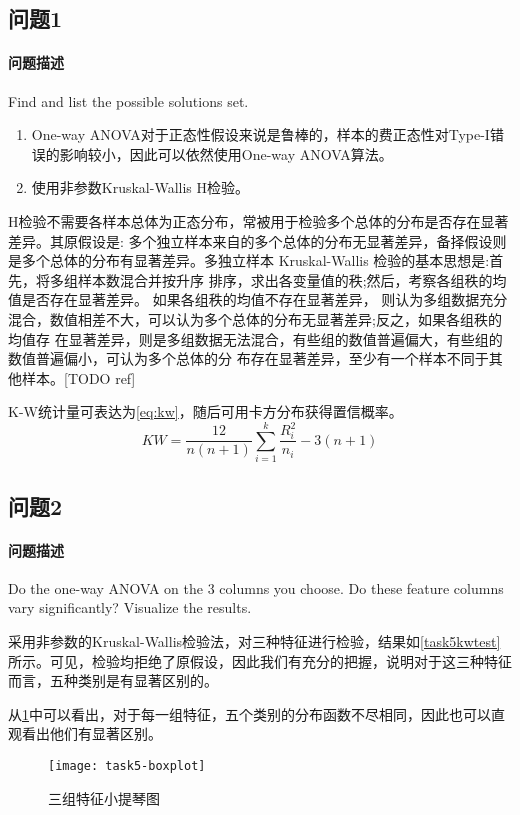 \documentclass[a4paper,12pt]{article}
\begin{document}
    \subsection{问题1} %
    \paragraph{问题描述} Find and list the possible solutions set.
    \begin{enumerate}
      \item One-way ANOVA对于正态性假设来说是鲁棒的，样本的费正态性对Type-I错误的影响较小，因此可以依然使用One-way ANOVA算法。
      \item 使用非参数Kruskal-Wallis H检验。
    \end{enumerate}

    H检验不需要各样本总体为正态分布，常被用于检验多个总体的分布是否存在显著差异。其原假设是: 多个独立样本来自的多个总体的分布无显著差异，备择假设则是多个总体的分布有显著差异。多独立样本 Kruskal-Wallis 检验的基本思想是:首先，将多组样本数混合并按升序 排序，求出各变量值的秩;然后，考察各组秩的均值是否存在显著差异。 如果各组秩的均值不存在显著差异， 则认为多组数据充分混合，数值相差不大，可以认为多个总体的分布无显著差异;反之，如果各组秩的均值存 在显著差异，则是多组数据无法混合，有些组的数值普遍偏大，有些组的数值普遍偏小，可认为多个总体的分 布存在显著差异，至少有一个样本不同于其他样本。[TODO ref]

    K-W统计量可表达为\cref{eq:kw}，随后可用卡方分布获得置信概率。
    \begin{equation}
      \label{eq:kw}
      KW = \frac{12}{n(n+1)}\sum_{i=1}^k{\frac{R_i^2}{n_i}-3(n+1)}
    \end{equation}
    \subsection{问题2}
    \paragraph{问题描述} Do the one-way ANOVA on the 3 columns you choose. Do these feature columns vary significantly? Visualize the results.

    采用非参数的Kruskal-Wallis检验法，对三种特征进行检验，结果如\cref{task5kwtest}所示。可见，检验均拒绝了原假设，因此我们有充分的把握，说明对于这三种特征而言，五种类别是有显著区别的。
    

    从\cref{fig:violin3}中可以看出，对于每一组特征，五个类别的分布函数不尽相同，因此也可以直观看出他们有显著区别。
    \begin{figure}
      \texttt{[image: task5-boxplot]}
      \caption{三组特征小提琴图}
      \label{fig:violin3}
    \end{figure}
\end{document}
